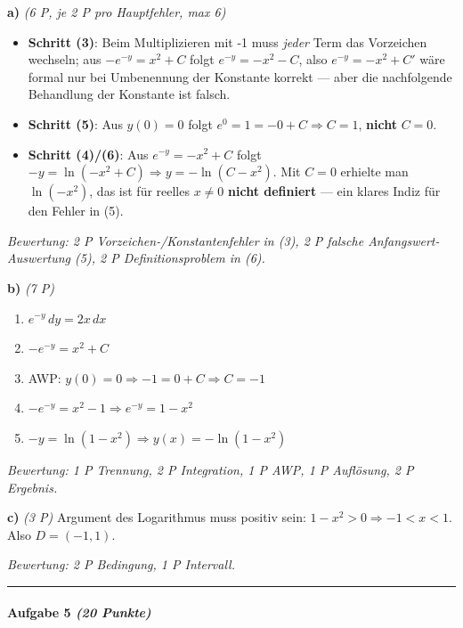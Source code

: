\documentclass[11pt, a4paper]{article}
\begin{document}
\textbf{a)} \textit{(6 P, je 2 P pro Hauptfehler, max 6)}

\begin{itemize}
  \item \textbf{Schritt (3)}: Beim Multiplizieren mit -1 muss \textit{jeder} Term das Vorzeichen wechseln; aus $-e^{-y} = x^2 + C$ folgt $e^{-y} = -x^2 - C$, also $e^{-y} = -x^2 + C'$ wäre formal nur bei Umbenennung der Konstante korrekt — aber die nachfolgende Behandlung der Konstante ist falsch.
  \item \textbf{Schritt (5)}: Aus $y(0) = 0$ folgt $e^0 = 1 = -0 + C \Rightarrow C = 1$, \textbf{nicht} $C = 0$.
  \item \textbf{Schritt (4)/(6)}: Aus $e^{-y} = -x^2 + C$ folgt $-y = \ln(-x^2 + C) \Rightarrow y = -\ln(C - x^2)$. Mit $C=0$ erhielte man $\ln(-x^2)$, das ist für reelles $x \neq 0$ \textbf{nicht definiert} — ein klares Indiz für den Fehler in (5).
\end{itemize}

\textit{Bewertung: 2 P Vorzeichen-/Konstantenfehler in (3), 2 P falsche Anfangswert-Auswertung (5), 2 P Definitionsproblem in (6).}


\textbf{b)} \textit{(7 P)}

\begin{enumerate}
  \item $e^{-y}\,dy = 2x\,dx$
  \item $-e^{-y} = x^2 + C$
  \item AWP: $y(0)=0 \Rightarrow -1 = 0 + C \Rightarrow C = -1$
  \item $-e^{-y} = x^2 - 1 \Rightarrow e^{-y} = 1 - x^2$
  \item $-y = \ln(1 - x^2) \Rightarrow \boxed{y(x) = -\ln(1 - x^2)}$
\end{enumerate}

\textit{Bewertung: 1 P Trennung, 2 P Integration, 1 P AWP, 1 P Auflösung, 2 P Ergebnis.}


\textbf{c)} \textit{(3 P)} Argument des Logarithmus muss positiv sein: $1 - x^2 > 0 \Rightarrow -1 < x < 1$. Also $D = (-1, 1)$.

\textit{Bewertung: 2 P Bedingung, 1 P Intervall.}



\noindent\textcolor{rulegray}{\rule{\linewidth}{0.4pt}}


\paragraph{Aufgabe 5 \textit{(20 Punkte)}}\mbox{}\\[2pt]
\end{document}
